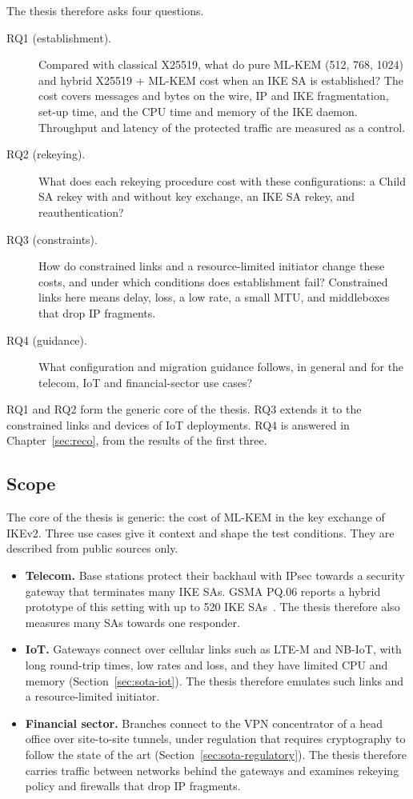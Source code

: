 The thesis therefore asks four questions.
\begin{description}
    \item[RQ1 (establishment).] Compared with classical X25519, what do pure
    ML-KEM (512, 768, 1024) and hybrid X25519 + ML-KEM cost when an IKE SA is
    established? The cost covers messages and bytes on the wire, IP and IKE
    fragmentation, set-up time, and the CPU time and memory of the IKE
    daemon. Throughput and latency of the protected traffic are measured as
    a control.
    \item[RQ2 (rekeying).] What does each rekeying procedure cost with these
    configurations: a Child SA rekey with and without key exchange, an IKE SA
    rekey, and reauthentication?
    \item[RQ3 (constraints).] How do constrained links and a resource-limited
    initiator change these costs, and under which conditions does
    establishment fail? Constrained links here means delay, loss, a low rate,
    a small MTU, and middleboxes that drop IP fragments.
    \item[RQ4 (guidance).] What configuration and migration guidance follows,
    in general and for the telecom, IoT and financial-sector use cases?
\end{description}
RQ1 and RQ2 form the generic core of the thesis. RQ3 extends it to the
constrained links and devices of IoT deployments. RQ4 is answered in
Chapter~\ref{sec:reco}, from the results of the first three.

\subsection{Scope}
\label{sec:analysis-scope}

The core of the thesis is generic: the cost of ML-KEM in the key exchange of
IKEv2. Three use cases give it context and shape the test conditions. They are
described from public sources only.
\begin{itemize}
    \item \textbf{Telecom.} Base stations protect their backhaul with IPsec
    towards a security gateway that terminates many IKE SAs. GSMA PQ.06
    reports a hybrid prototype of this setting with up to 520 IKE
    SAs~\cite{gsmaPq06}. The thesis therefore also measures many SAs towards
    one responder.
    \item \textbf{IoT.} Gateways connect over cellular links such as LTE-M and
    NB-IoT, with long round-trip times, low rates and loss, and they have
    limited CPU and memory (Section~\ref{sec:sota-iot}). The thesis therefore
    emulates such links and a resource-limited initiator.
    \item \textbf{Financial sector.} Branches connect to the VPN concentrator
    of a head office over site-to-site tunnels, under regulation that requires
    cryptography to follow the state of the art
    (Section~\ref{sec:sota-regulatory}). The thesis therefore carries traffic
    between networks behind the gateways and examines rekeying policy and
    firewalls that drop IP fragments.
\end{itemize}

